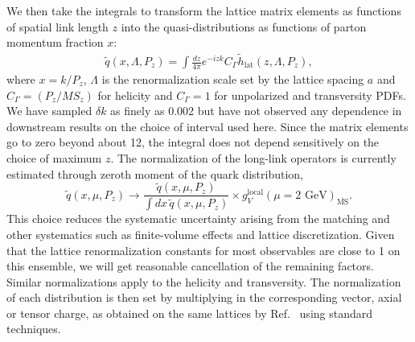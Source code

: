 We then take the integrals to transform the lattice matrix elements as functions of spatial link length $z$ into the quasi-distributions as functions of parton momentum fraction $x$:
%
\begin{align}
\label{eq:qlat}
\tilde{q}(x,\Lambda,P_z) = \int \frac{dz}{4\pi} e^{-i z k} C_\Gamma \tilde{h}_\text{lat}(z,\Lambda,P_z),
\end{align}
% 
where $x=k/P_z$, $\Lambda$ is the renormalization scale set by the lattice spacing $a$ and $C_\Gamma=(P_z/M S_z)$ for helicity and $C_\Gamma=1$
for unpolarized and transversity PDFs.
We have sampled $\delta k$ as finely as 0.002 but have
not observed any dependence in downstream results on the choice of interval used here.
Since the matrix elements go to zero beyond about 12, the integral does not depend sensitively on the 
choice of maximum $z$. %
The normalization of the long-link operators is currently 
estimated through zeroth moment of the quark distribution,
%
\begin{equation}
\label{eq:49}
\tilde{q}(x,\mu,P_z) \rightarrow \frac{\tilde{q}(x,\mu,P_z)}{\int\!dx\,\tilde{q}(x,\mu,P_z)} \times
  g_V^\text{local}(\mu=2\mbox{ GeV})_{\overline{\text{MS}}}.
\end{equation}
%
This choice reduces the systematic uncertainty arising from the matching
and other systematics such as finite-volume effects and lattice discretization. 
Given that the lattice renormalization constants for most observables are close to 1 on this ensemble,
we will get reasonable cancellation of the remaining factors. 
Similar normalizations apply to the helicity and transversity. 
The normalization of each distribution is then set by multiplying in
the corresponding vector, axial or tensor charge, as obtained on the
same lattices by Ref.~\cite{Bhattacharya:2013ehc} using standard techniques.

